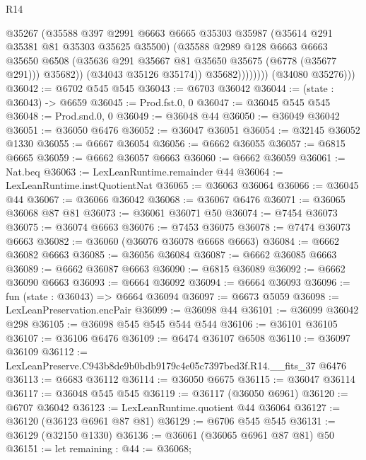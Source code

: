 \begin{lexlean}{R14}
\begin{coremodule}
                          @35267
                          (@35588
                            @397
                            @2991
                            @6663
                            @6665
                            @35303
                            @35987
                            (@35614 @291 @35381 @81 @35303 @35625 @35500)
                            (@35588
                              @2989
                              @128
                              @6663
                              @6663
                              @35650
                              @6508
                              (@35636 @291 @35667 @81 @35650 @35675 (@6778 (@35677 @291)))
                              @35682))
                          (@34043 @35126 @35174))
                        @35682))))))))
        (@34080 @35276)))
@36042 := @6702 @545 @545
@36043 := @6703 @36042
@36044 := (state : @36043) -> @6659
@36045 := Prod.fst.{0, 0}
@36047 := @36045 @545 @545
@36048 := Prod.snd.{0, 0}
@36049 := @36048 @44
@36050 := @36049 @36042
@36051 := @36050 @6476
@36052 := @36047 @36051
@36054 := @32145 @36052 @1330
@36055 := @6667 @36054
@36056 := @6662 @36055
@36057 := @6815 @6665
@36059 := @6662 @36057 @6663
@36060 := @6662 @36059
@36061 := Nat.beq
@36063 := LexLeanRuntime.remainder @44
@36064 := LexLeanRuntime.instQuotientNat
@36065 := @36063 @36064
@36066 := @36045 @44
@36067 := @36066 @36042
@36068 := @36067 @6476
@36071 := @36065 @36068 @87 @81
@36073 := @36061 @36071 @50
@36074 := @7454 @36073
@36075 := @36074 @6663
@36076 := @7453 @36075
@36078 := @7474 @36073 @6663
@36082 := @36060 (@36076 @36078 @6668 @6663)
@36084 := @6662 @36082 @6663
@36085 := @36056 @36084
@36087 := @6662 @36085 @6663
@36089 := @6662 @36087 @6663
@36090 := @6815 @36089
@36092 := @6662 @36090 @6663
@36093 := @6664 @36092
@36094 := @6664 @36093
@36096 := fun (state : @36043) => @6664 @36094
@36097 := @6673 @5059
@36098 := LexLeanPreservation.encPair
@36099 := @36098 @44
@36101 := @36099 @36042 @298
@36105 := @36098 @545 @545 @544 @544
@36106 := @36101 @36105
@36107 := @36106 @6476
@36109 := @6474 @36107 @6508
@36110 := @36097 @36109
@36112 := LexLeanPreserve.C943b8de9b0bdb9179c4e05c7397bed3f.R14.__fits_37 @6476
@36113 := @6683 @36112
@36114 := @36050 @6675
@36115 := @36047 @36114
@36117 := @36048 @545 @545
@36119 := @36117 (@36050 @6961)
@36120 := @6707 @36042
@36123 := LexLeanRuntime.quotient @44 @36064
@36127 := @36120 (@36123 @6961 @87 @81)
@36129 := @6706 @545 @545
@36131 := @36129 (@32150 @1330)
@36136 := @36061 (@36065 @6961 @87 @81) @50
@36151 := let remaining : @44 := @36068;

\end{coremodule}
\end{lexlean}

